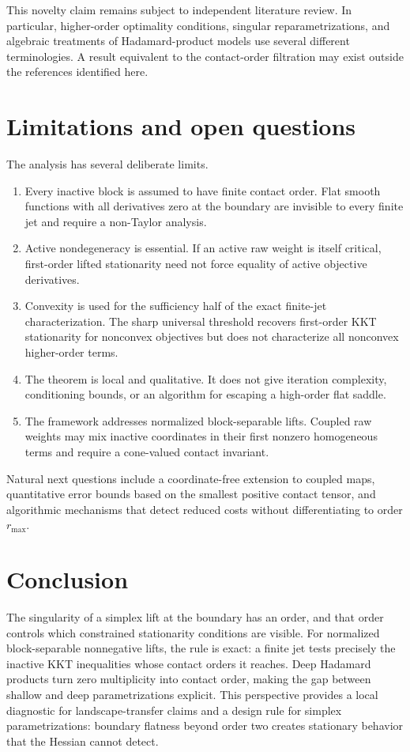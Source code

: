 \documentclass[11pt]{article}
\theoremstyle{definition}
\theoremstyle{remark}
\begin{document}
This novelty claim remains subject to independent literature review. In
particular, higher-order optimality conditions, singular reparametrizations,
and algebraic treatments of Hadamard-product models use several different
terminologies. A result equivalent to the contact-order filtration may exist
outside the references identified here.

\section{Limitations and open questions}\label{sec:limitations}

The analysis has several deliberate limits.
\begin{enumerate}[label=(\roman*)]
  \item Every inactive block is assumed to have finite contact order. Flat
  smooth functions with all derivatives zero at the boundary are invisible to
  every finite jet and require a non-Taylor analysis.
  \item Active nondegeneracy is essential. If an active raw weight is itself
  critical, first-order lifted stationarity need not force equality of active
  objective derivatives.
  \item Convexity is used for the sufficiency half of the exact finite-jet
  characterization. The sharp universal threshold recovers first-order KKT
  stationarity for nonconvex objectives but does not characterize all
  nonconvex higher-order terms.
  \item The theorem is local and qualitative. It does not give iteration
  complexity, conditioning bounds, or an algorithm for escaping a high-order
  flat saddle.
  \item The framework addresses normalized block-separable lifts. Coupled raw
  weights may mix inactive coordinates in their first nonzero homogeneous
  terms and require a cone-valued contact invariant.
\end{enumerate}

Natural next questions include a coordinate-free extension to coupled maps,
quantitative error bounds based on the smallest positive contact tensor, and
algorithmic mechanisms that detect reduced costs without differentiating to
order $r_{\max}$.

\section{Conclusion}

The singularity of a simplex lift at the boundary has an order, and that order
controls which constrained stationarity conditions are visible. For
normalized block-separable nonnegative lifts, the rule is exact: a finite jet
tests precisely the inactive KKT inequalities whose contact orders it reaches.
Deep Hadamard products turn zero multiplicity into contact order, making the
gap between shallow and deep parametrizations explicit. This perspective
provides a local diagnostic for landscape-transfer claims and a design rule
for simplex parametrizations: boundary flatness beyond order two creates
stationary behavior that the Hessian cannot detect.



\end{document}
